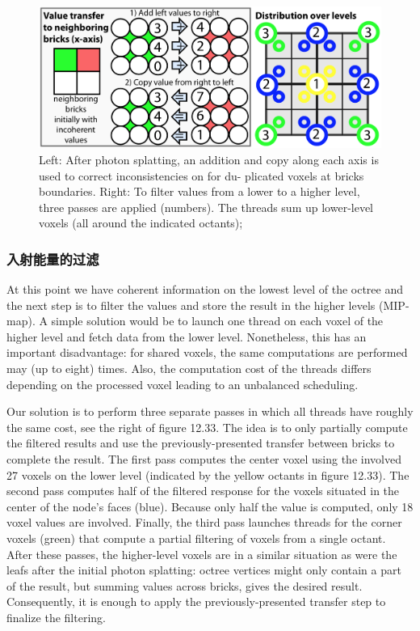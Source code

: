 \begin{figure}
	\includegraphics[width=\textwidth]{figures/vct/light-transfer}
	\caption{Left: After photon splatting, an addition and copy along each axis is used to correct inconsistencies on for du- plicated voxels at bricks boundaries. Right: To filter values from a lower to a higher level, three passes are applied (numbers). The threads sum up lower-level voxels (all around the indicated octants);}
	\label{f:vct-light-transfer}
\end{figure}



\subsubsection{入射能量的过滤}
At this point we have coherent information on the lowest level of the octree and the next step is to filter the values and store the result in the higher levels (MIP-map). A simple solution would be to launch one thread on each voxel of the higher level and fetch data from the lower level. Nonetheless, this has an important disadvantage: for shared voxels, the same computations are performed may (up to eight) times. Also, the computation cost of the threads differs depending on the processed voxel leading to an unbalanced scheduling.

Our solution is to perform three separate passes in which all threads have roughly the same cost, see the right of figure 12.33. The idea is to only partially compute the filtered results and use the previously-presented transfer between bricks to complete the result. The first pass computes the center voxel using the involved 27 voxels on the lower level (indicated by the yellow octants in figure 12.33). The second pass computes half of the filtered response for the voxels situated in the center of the node’s faces (blue). Because only half the value is computed, only 18 voxel values are involved. Finally, the third pass launches threads for the corner voxels (green) that compute a partial filtering of voxels from a single octant. After these passes, the higher-level voxels are in a similar situation as were the leafs after the initial photon splatting: octree vertices might only contain a part of the result, but summing values across bricks, gives the desired result. Consequently, it is enough to apply the previously-presented transfer step to finalize the filtering.



